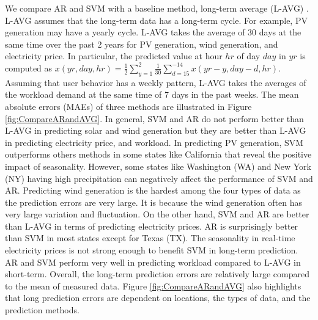 We compare AR and SVM with a baseline method, long-term average
(L-AVG) {\cite{sinden2007characteristics}}. L-AVG assumes that the
long-term data has a long-term cycle. For example, PV generation may
have a yearly cycle. L-AVG takes the average of 30 days at the same
time over the past 2 years for PV generation, wind generation, and
electricity price. In particular, the predicted value at hour $hr$ of
day $day$ in $yr$ is computed as $x(yr, day,hr) =
\frac{1}{2}\sum_{y=1}^{2}\frac{1}{30}\sum_{d=15}^{-14}x(yr-y,day-d,hr)
.$ Assuming that user behavior has a weekly pattern, L-AVG takes the
averages of the workload demand at the same time of 7 days in the past
weeks. The mean absolute errors (MAEs) of three methods are
illustrated in Figure \ref{fig:CompareARandAVG}. In general, SVM and
AR do not perform better than L-AVG in predicting solar and wind
generation but they are better than L-AVG in predicting electricity
price, and workload. In predicting PV generation, SVM outperforms
others methods in some states like California that reveal the positive
impact of seasonality. However, some states like Washington (WA) and
New York (NY) having high precipitation can negatively affect the
performance of SVM and AR. Predicting wind generation is the hardest
among the four types of data as the prediction errors are very
large. It is because the wind generation often has very large
variation and fluctuation. On the other hand, SVM and AR are better
than L-AVG in terms of predicting electricity prices. AR is
surprisingly better than SVM in most states except for Texas (TX). The
seasonality in real-time electricity prices is not strong enough to
benefit SVM in long-term prediction. AR and SVM perform very well in
predicting workload compared to L-AVG in short-term. Overall, the
long-term prediction errors are relatively large compared to the mean
of measured data. Figure {\ref{fig:CompareARandAVG}} also highlights
that long prediction errors are dependent on locations, the types of
data, and the prediction methods. %

